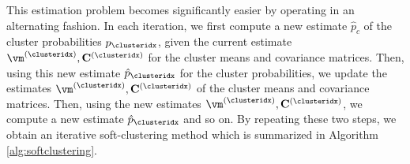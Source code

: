 \documentclass[12pt]{report}
\begin{document}
This estimation problem becomes significantly easier by operating 
in an alternating fashion. In each iteration, we first compute a new 
estimate $\hat{p}_{c}$ of the cluster probabilities $p_{\clusteridx}$, 
given the current estimate $\vm^{(\clusteridx)}, \mathbf{C}^{(\clusteridx)}$ 
for the cluster means and covariance matrices. Then, using this 
new estimate $\hat{p}_{\clusteridx}$ for the cluster probabilities, 
we update the estimates $\vm^{(\clusteridx)}, \mathbf{C}^{(\clusteridx)}$ 
of the cluster means and covariance matrices. Then, using the 
new estimates $\vm^{(\clusteridx)}, \mathbf{C}^{(\clusteridx)}$, we 
compute a new estimate $\hat{p}_{\clusteridx}$ and so on. By repeating 
these two steps, we obtain an iterative soft-clustering method which 
is summarized in Algorithm \ref{alg:softclustering}. 

\end{document}
